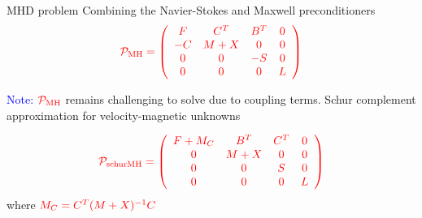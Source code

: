 \documentclass[12pt]{beamer}
\newcommand{\gr}[1]{\textcolor{darkgreen} {#1}}
\newcommand{\re}[1]{{\textcolor{red}       {#1}}}
\newcommand{\bl}[1]{{\textcolor{blue}{#1}}}
\begin{document}



\begin{frame}{MHD problem}
  Combining the Navier-Stokes and Maxwell preconditioners
  $$\re{\mathcal{P}_{\rm MH} =
  \left(
  \begin{array}{cccc}
F & C^T & B^T & 0\\
-C & M+X & 0 & 0 \\
0 & 0 & -S & 0\\
0 & 0 & 0 & L
  \end{array}
  \right)}$$

\vspace{2mm}

\bl{Note:} $\re{{\mathcal{P}_{\rm MH}}}$ remains challenging to solve due to coupling terms. Schur complement approximation for velocity-magnetic unknowns

$$\re{\mathcal{P}_{\rm schurMH} =
\left(
\begin{array}{cccc}
F  + M_C & B^T & C^T & 0\\
0 & M+X & 0 & 0 \\
0 & 0 & S & 0\\
0 & 0 & 0 & L
\end{array}
\right)}$$
where $\re{M_C = C^T (M + X)^{-1}C}$
\end{frame}
\end{document}

